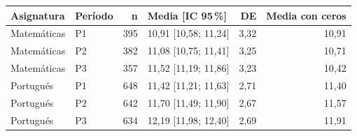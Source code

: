 \begin{tabular}{llrlrr}
\toprule
Asignatura & Período & n & Media [IC 95\,\%] & DE & Media con ceros \\
\midrule
Matemáticas & P1 & 395 & 10,91 [10,58; 11,24] & 3,32 & 10,91 \\
Matemáticas & P2 & 382 & 11,08 [10,75; 11,41] & 3,25 & 10,71 \\
Matemáticas & P3 & 357 & 11,52 [11,19; 11,86] & 3,23 & 10,42 \\
Portugués & P1 & 648 & 11,42 [11,21; 11,63] & 2,71 & 11,40 \\
Portugués & P2 & 642 & 11,70 [11,49; 11,90] & 2,67 & 11,57 \\
Portugués & P3 & 634 & 12,19 [11,98; 12,40] & 2,69 & 11,91 \\
\bottomrule
\end{tabular}
